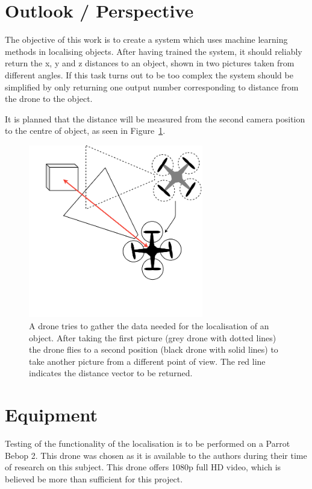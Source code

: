 \section{Outlook / Perspective}
The objective of this work is to create a system which uses machine learning methods in localising objects. After having trained the system, it should reliably return the x, y and z distances to an object, shown in two pictures taken from different angles. If this task turns out to be too complex the system should be simplified by only returning one output number corresponding to distance from the drone to the object.

It is planned that the distance will be measured from the second camera position to the centre of object, as seen in Figure~\ref{pic:introduction_outlookPerspective_pointsOfView}.

\begin{figure}[h]
	\centering
	\includegraphics[width=3in]{img/introduction_outlookPerspective_pointsOfView.png}
	\caption{A drone tries to gather the data needed for the localisation of an object. After taking the first picture (grey drone with dotted lines) the drone flies to a second position (black drone with solid lines) to take another picture from a different point of view. The red line indicates the distance vector to be returned.}
	\label{pic:introduction_outlookPerspective_pointsOfView}
\end{figure}

\section{Equipment}
Testing of the functionality of the localisation is to be performed on a Parrot Bebop 2. This drone was chosen as it is available to the authors during their time of research on this subject. This drone offers 1080p full HD video, which is believed be more than sufficient for this project.

